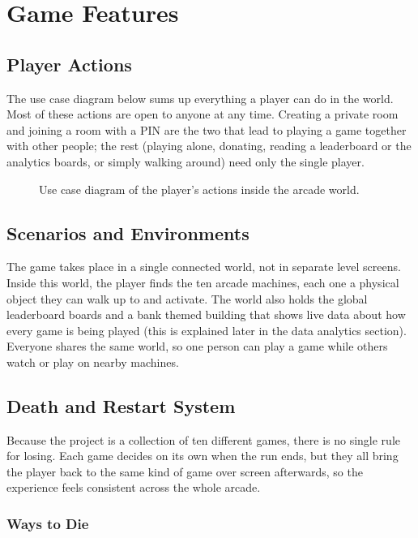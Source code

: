 \documentclass[12pt,letterpaper]{article}
\begin{document}
\section{Game Features}

\subsection{Player Actions}

The use case diagram below sums up everything a player can do in the world. Most of these actions are open to anyone at any time. Creating a private room and joining a room with a PIN are the two that lead to playing a game together with other people; the rest (playing alone, donating, reading a leaderboard or the analytics boards, or simply walking around) need only the single player.

\begin{figure}[H]
  \centering
  
  \caption{Use case diagram of the player's actions inside the arcade world.}
  \label{fig:usecase}
\end{figure}

\subsection{Scenarios and Environments}

The game takes place in a single connected world, not in separate level screens. Inside this world, the player finds the ten arcade machines, each one a physical object they can walk up to and activate. The world also holds the global leaderboard boards and a bank themed building that shows live data about how every game is being played (this is explained later in the data analytics section). Everyone shares the same world, so one person can play a game while others watch or play on nearby machines.

\subsection{Death and Restart System}

Because the project is a collection of ten different games, there is no single rule for losing. Each game decides on its own when the run ends, but they all bring the player back to the same kind of game over screen afterwards, so the experience feels consistent across the whole arcade.

\subsubsection{Ways to Die}
\end{document}
